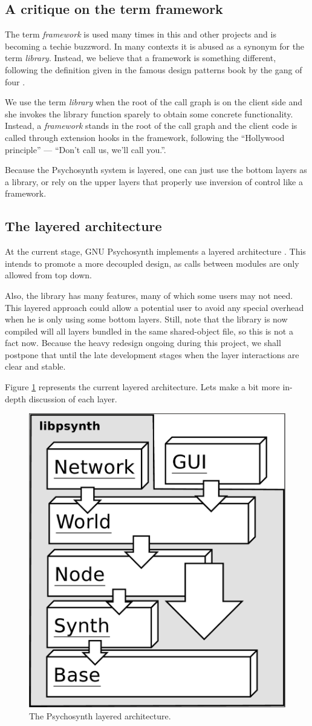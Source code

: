 \subsection{A critique on the term framework}

The term \emph{framework} is used many times in this and other
projects and is becoming a techie buzzword. In many contexts it is
abused as a synonym for the term \emph{library}. Instead, we believe
that a framework is something different, following the definition
given in the famous design patterns book by the gang of
four \cite{gamma95design}.

We use the term \emph{library} when the root of the call graph is on
the client side and she invokes the library function sparely to obtain
some concrete functionality. Instead, a \emph{framework} stands in the
root of the call graph and the client code is called through extension
hooks in the framework, following the ``Hollywood principle'' ---
``Don't call us, we'll call you.''.

Because the Psychosynth system is layered, one can just use the bottom
layers as a library, or rely on the upper layers that properly use
inversion of control like a framework.

\subsection{The layered architecture}

At the current stage, GNU Psychosynth implements a layered
architecture \cite{garlan94software}. This intends to promote a more
decoupled design, as calls between modules are only allowed from top
down.

Also, the library has many features, many of which some users may
not need. This layered approach could allow a potential user to avoid
any special overhead when he is only using some bottom layers. Still,
note that the library is now compiled will all layers bundled in the
same shared-object file, so this is not a fact now. Because the heavy
redesign ongoing during this project, we shall postpone that until the
late development stages when the layer interactions are clear and
stable.

Figure \ref{fig:layers} represents the current layered
architecture. Lets make a bit more in-depth discussion of each layer.

\begin{figure}[h!]\centering
\includegraphics[width=.4\textwidth]{pic/layers.png}
\caption{The Psychosynth layered architecture.}
\label{fig:layers}
\end{figure}

